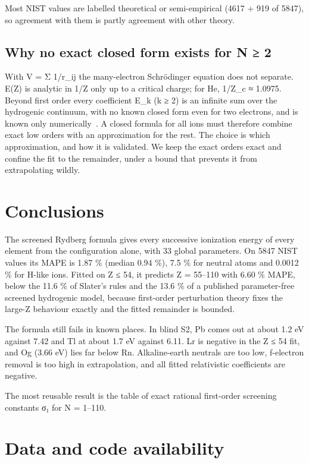 \documentclass[aps,pra,preprint,superscriptaddress,amsmath,amssymb]{revtex4-2}
\begin{document}
Most NIST values are labelled theoretical or semi-empirical (4617 + 919 of 5847), so agreement with them is partly agreement with other theory.


\subsection{Why no exact closed form exists for N ≥ 2}

With V = Σ 1/r\_ij the many-electron Schrödinger equation does not separate. E(Z) is analytic in 1/Z only up to a critical charge; for He, 1/Z\_c ≈ 1.0975. Beyond first order every coefficient E\_k (k ≥ 2) is an infinite sum over the hydrogenic continuum, with no known closed form even for two electrons, and is known only numerically~\cite{r6}. A closed formula for all ions must therefore combine exact low orders with an approximation for the rest. The choice is which approximation, and how it is validated. We keep the exact orders exact and confine the fit to the remainder, under a bound that prevents it from extrapolating wildly.


\section{Conclusions}

The screened Rydberg formula gives every successive ionization energy of every element from the configuration alone, with 33 global parameters. On 5847 NIST values its MAPE is 1.87 \% (median 0.94 \%), 7.5 \% for neutral atoms and 0.0012 \% for H-like ions. Fitted on Z ≤ 54, it predicts Z = 55–110 with 6.60 \% MAPE, below the 11.6 \% of Slater's rules and the 13.6 \% of a published parameter-free screened hydrogenic model, because first-order perturbation theory fixes the large-Z behaviour exactly and the fitted remainder is bounded.


The formula still fails in known places. In blind S2, Pb comes out at about 1.2 eV against 7.42 and Tl at about 1.7 eV against 6.11. Lr is negative in the Z ≤ 54 fit, and Og (3.66 eV) lies far below Rn. Alkaline-earth neutrals are too low, f-electron removal is too high in extrapolation, and all fitted relativistic coefficients are negative.


The most reusable result is the table of exact rational first-order screening constants σ₁ for N = 1–110.


\section*{Data and code availability}
\end{document}
